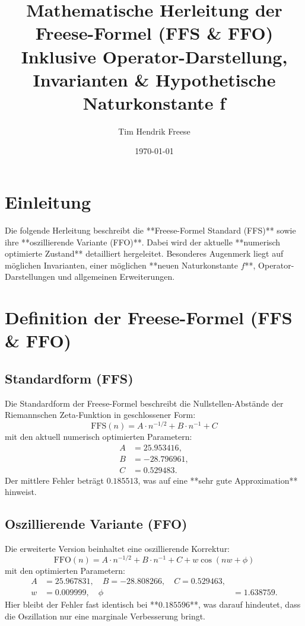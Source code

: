 \documentclass[a4paper,12pt]{article}
\title{\textbf{Mathematische Herleitung der Freese-Formel (FFS \& FFO)} \\ 
\large Inklusive Operator-Darstellung, Invarianten \& Hypothetische Naturkonstante f}
\author{Tim Hendrik Freese}
\date{\today}
\begin{document}
\maketitle
\tableofcontents
\newpage

\section{Einleitung}
Die folgende Herleitung beschreibt die **Freese-Formel Standard (FFS)** sowie ihre **oszillierende Variante (FFO)**. Dabei wird der aktuelle **numerisch optimierte Zustand** detailliert hergeleitet.  
Besonderes Augenmerk liegt auf möglichen Invarianten, einer möglichen **neuen Naturkonstante $f$**, Operator-Darstellungen und allgemeinen Erweiterungen.

\section{Definition der Freese-Formel (FFS \& FFO)}
\subsection{Standardform (FFS)}
Die Standardform der Freese-Formel beschreibt die Nullstellen-Abstände der Riemannschen Zeta-Funktion in geschlossener Form:
\begin{equation}
    \text{FFS}(n) = A \cdot n^{-1/2} + B \cdot n^{-1} + C
\end{equation}
mit den aktuell numerisch optimierten Parametern:
\begin{align*}
    A &= 25.953416, \\
    B &= -28.796961, \\
    C &= 0.529483.
\end{align*}
Der mittlere Fehler beträgt $0.185513$, was auf eine **sehr gute Approximation** hinweist.

\subsection{Oszillierende Variante (FFO)}
Die erweiterte Version beinhaltet eine oszillierende Korrektur:
\begin{equation}
    \text{FFO}(n) = A \cdot n^{-1/2} + B \cdot n^{-1} + C + w \cos(nw + \phi)
\end{equation}
mit den optimierten Parametern:
\begin{align*}
    A &= 25.967831, \quad B = -28.808266, \quad C = 0.529463, \\
    w &= 0.009999, \quad \phi &= 1.638759.
\end{align*}
Hier bleibt der Fehler fast identisch bei **$0.185596$**, was darauf hindeutet, dass die Oszillation nur eine marginale Verbesserung bringt.
\end{document}
